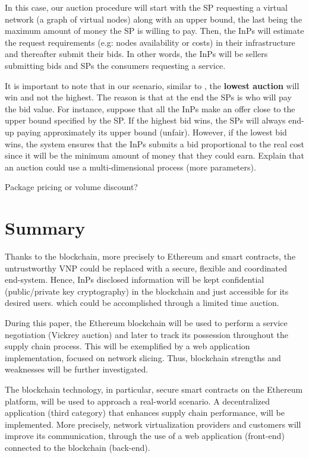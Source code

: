 In this case, our auction procedure will start with the SP requesting a virtual network (a graph of virtual nodes) along with an upper bound, the last being the maximum amount of money the SP is willing to pay. Then, the InPs will estimate the request requirements (e.g: nodes availability or costs) in their infrastructure and thereafter submit their bids. In other words, the InPs will be sellers submitting bids and SPs the consumers requesting a service.

It is important to note that in our scenario, similar to \citep{zaheer2010multi}, the \textbf{lowest auction} will win and not the highest. The reason is that at the end the SPs is who will pay the bid value. For instance, suppose that all the InPs make an offer close to the upper bound specified by the SP. If the highest bid wins, the SPs will always end-up paying approximately its upper bound (unfair). However, if the lowest bid wins, the system ensures that the InPs submits a bid proportional to the real cost since it will be the minimum amount of money that they could earn.
Explain that an auction could use a multi-dimensional process (more parameters).

Package pricing or volume discount?


\section{Summary}

Thanks to the blockchain, more precisely to Ethereum and smart contracts, the untrustworthy VNP could be replaced with a secure, flexible and coordinated end-system. Hence, InPs disclosed information will be kept confidential (public/private key cryptography) in the blockchain and just accessible for its desired users. which could be accomplished through a limited time auction.

During this paper, the Ethereum blockchain will be used to perform a service negotiation (Vickrey auction) and later to track its possession throughout the supply chain process. This will be exemplified by a web application implementation, focused on network slicing. Thus, blockchain strengths and weaknesses will be further investigated.

The blockchain technology, in particular, secure smart contracts on the Ethereum platform, will be used to approach a real-world scenario. A decentralized application (third category) that enhances supply chain performance, will be implemented. More precisely, network virtualization providers and customers will improve its communication, through the use of a web application (front-end) connected to the blockchain (back-end).

